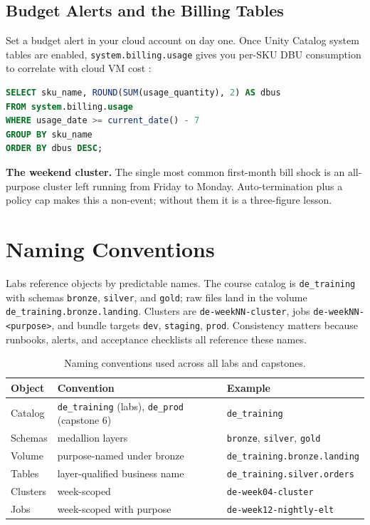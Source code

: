 \subsection{Budget Alerts and the Billing Tables}
Set a budget alert in your cloud account on day one. Once Unity Catalog system tables are enabled, \texttt{system.billing.usage} gives you per-SKU DBU consumption to correlate with cloud VM cost \cite{databricksSystemTables}:

\begin{lstlisting}[language=SQL,caption={Weekly DBU consumption by SKU---run it every Friday.},label={lst:ch0-billing}]
SELECT sku_name, ROUND(SUM(usage_quantity), 2) AS dbus
FROM system.billing.usage
WHERE usage_date >= current_date() - 7
GROUP BY sku_name
ORDER BY dbus DESC;
\end{lstlisting}

\begin{pitfall}
\textbf{The weekend cluster.} The single most common first-month bill shock is an all-purpose cluster left running from Friday to Monday. Auto-termination plus a policy cap makes this a non-event; without them it is a three-figure lesson.
\end{pitfall}

\section{Naming Conventions}
Labs reference objects by predictable names. The course catalog is \texttt{de\_training} with schemas \texttt{bronze}, \texttt{silver}, and \texttt{gold}; raw files land in the volume \texttt{de\_training.bronze.landing}. Clusters are \texttt{de-weekNN-cluster}, jobs \texttt{de-weekNN-<purpose>}, and bundle targets \texttt{dev}, \texttt{staging}, \texttt{prod}. Consistency matters because runbooks, alerts, and acceptance checklists all reference these names.

\begin{table}[H]
\centering
\small
\begin{tabular}{@{}p{3.4cm}p{4.4cm}p{5.4cm}@{}}
\toprule
\textbf{Object} & \textbf{Convention} & \textbf{Example} \\
\midrule
Catalog & \texttt{de\_training} (labs), \texttt{de\_prod} (capstone 6) & \texttt{de\_training} \\
Schemas & medallion layers & \texttt{bronze}, \texttt{silver}, \texttt{gold} \\
Volume & purpose-named under bronze & \texttt{de\_training.bronze.landing} \\
Tables & layer-qualified business name & \texttt{de\_training.silver.orders} \\
Clusters & week-scoped & \texttt{de-week04-cluster} \\
Jobs & week-scoped with purpose & \texttt{de-week12-nightly-elt} \\
\bottomrule
\end{tabular}
\caption{Naming conventions used across all labs and capstones.}
\label{tab:ch0-naming}
\end{table}

